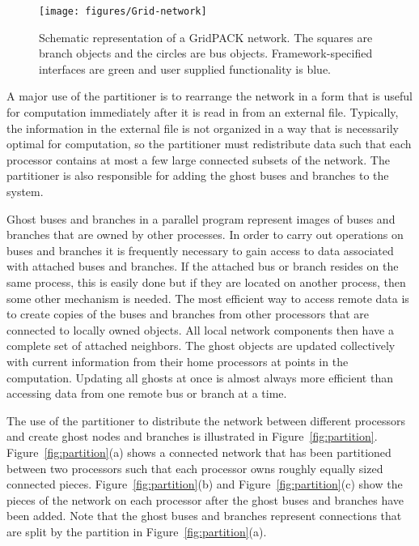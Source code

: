 \begin{figure}
  \centering
    \texttt{[image: figures/Grid-network]}
  \caption{Schematic representation of a GridPACK network. The squares are branch objects and the circles are bus objects. Framework-specified interfaces are green and user supplied functionality is blue.}
  \label{fig:network}
\end{figure}

A major use of the partitioner is to rearrange the network in a form that is useful for computation immediately after it is read in from an external file. Typically, the information in the external file is not organized in a way that is necessarily optimal for computation, so the partitioner must redistribute data such that each processor contains at most a few large connected subsets of the network. The partitioner is also responsible for adding the ghost buses and branches to the system.

Ghost buses and branches in a parallel program represent images of buses and
branches that are owned by other processes. In order to carry out operations on
buses and branches it is frequently necessary to gain access to data associated
with attached buses and branches. If the attached bus or branch resides on the
same process, this is easily done but if they are located on another process,
then some other mechanism is needed. The most efficient way to access remote
data is to create copies of the buses and branches from other processors that are connected to locally owned objects. All local network components then have a complete set of attached neighbors. The ghost objects are updated collectively with current information from their home processors at points in the computation. Updating all ghosts at once is almost always more efficient than accessing data from one remote bus or branch at a time.

The use of the partitioner to distribute the network between different
processors and create ghost nodes and branches is illustrated in
Figure~\ref{fig:partition}.  Figure~\ref{fig:partition}(a) shows a connected network that has been
partitioned between two processors such that each processor owns roughly equally
sized connected pieces. Figure~\ref{fig:partition}(b) and
Figure~\ref{fig:partition}(c) show the pieces of the network on each processor
after the ghost buses and branches have been added. Note that the ghost buses
and branches represent connections that are split by the partition in
Figure~\ref{fig:partition}(a).

